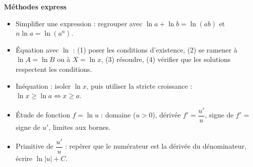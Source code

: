 \documentclass[11pt]{article}
\newcommand{\cle}[1]{{\popxbold\color{popdark}#1}}
\begin{document}
\begin{aretenir}
\textbf{Méthodes express}
\begin{itemize}
  \item \cle{Simplifier} une expression : regrouper avec $\ln a + \ln b = \ln(ab)$ et $n\ln a = \ln(a^n)$.
  \item \cle{Équation} avec $\ln$ : (1) poser les conditions d'existence, (2) se ramener à $\ln A = \ln B$ ou à $X = \ln x$, (3) résoudre, (4) vérifier que les solutions respectent les conditions.
  \item \cle{Inéquation} : isoler $\ln x$, puis utiliser la stricte croissance : $\ln x \geq \ln a \Leftrightarrow x \geq a$.
  \item \cle{Étude de fonction} $f = \ln u$ : domaine ($u>0$), dérivée $f' = \dfrac{u'}{u}$, signe de $f'$ = signe de $u'$, limites aux bornes.
  \item \cle{Primitive} de $\dfrac{u'}{u}$ : repérer que le numérateur est la dérivée du dénominateur, écrire $\ln|u| + C$.
\end{itemize}
\end{aretenir}
\end{document}
